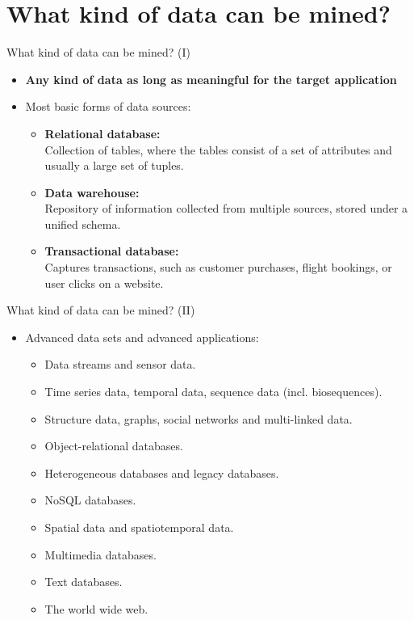 \section{What kind of data can be mined?}

\begin{frame}{What kind of data can be mined? (I)}
	\begin{itemize}
		\item \textbf{Any kind of data as long as meaningful for the target
			      application}
		\item Most basic forms of data sources:
		      \begin{itemize}
			      \item \textbf{Relational database:} \\
			            \small{Collection of tables, where the tables consist of a
				            set of attributes and usually a large set of tuples.}
			      \item \textbf{Data warehouse:} \\
			            \small{Repository of information collected from multiple
				            sources, stored under a unified schema.}
			      \item \textbf{Transactional database:} \\
			            \small{Captures transactions, such as customer purchases,
				            flight bookings, or user clicks on a website.}
		      \end{itemize}
	\end{itemize}
\end{frame}
\begin{frame}{What kind of data can be mined? (II)}
	\begin{itemize}
		\item Advanced data sets and advanced applications:
		      \begin{itemize}
			      \item Data streams and sensor data.
			      \item Time series data, temporal data, sequence data (incl.
			            biosequences).
			      \item Structure data, graphs, social networks and multi-linked data.
			      \item Object-relational databases.
			      \item Heterogeneous databases and legacy databases.
			      \item NoSQL databases.
			      \item Spatial data and spatiotemporal data.
			      \item Multimedia databases.
			      \item Text databases.
			      \item The world wide web.
		      \end{itemize}
	\end{itemize}
\end{frame}
